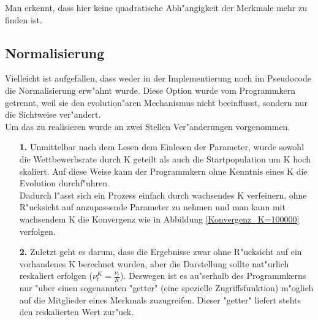 \documentclass[11pt, a4paper, german]{article}
\theoremstyle{plain}
\begin{document}
	Man erkennt, dass hier keine quadratische Abh"angigkeit der Merkmale mehr zu finden ist.
	
	\subsection{Normalisierung}
	Vielleicht ist aufgefallen, dass weder in der Implementierung noch im Pseudocode die Normalisierung erw"ahnt wurde. Diese Option wurde vom Programmkern getrennt, weil sie den evolution"aren Mechanismus nicht beeinflusst, sondern nur die Sichtweise ver"andert.\\
	Um das zu realisieren wurde an zwei Stellen Ver"anderungen vorgenommen.
	\begin{itemize}
		\item [\textbf{1.}] Unmittelbar nach dem Lesen dem Einlesen der Parameter, wurde sowohl die Wettbewerbsrate durch K geteilt als auch die Startpopulation um K hoch skaliert. Auf diese Weise kann der Programmkern ohne Kenntnis eines K die Evolution durchf"uhren.\\ 
		Dadurch l"asst sich ein Prozess einfach durch wachsendes K verfeinern, ohne R"ucksicht auf anzupassende Parameter zu nehmen und man kann mit wachsendem K die Konvergenz wie in Abbildung \ref{Konvergenz_K=100000} verfolgen.
		\item [\textbf{2.}] Zuletzt geht es darum, dass die Ergebnisse zwar ohne R"ucksicht auf ein vorhandenes K berechnet wurden, aber die Darstellung sollte nat"urlich reskaliert erfolgen ($ \nu_t^K = \frac{\nu_t}{K} $). Deswegen ist es au"serhalb des Programmkerns nur "uber einen sogenannten "{}getter"{} (eine spezielle Zugriffsfunktion) m"oglich auf die Mitglieder eines Merkmals zuzugreifen. Dieser "{}getter"{} liefert stehts den reskalierten Wert zur"uck.\\
	\end{itemize}
	
\end{document}
